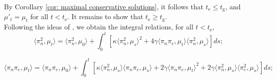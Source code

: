 By Corollary \ref{cor: maximal conservative solutions}, it follows that $t_\mathrm{e} \le t_\mathrm{g}$, and $\mu'_t=\mu_t$ for all $t<t_\mathrm{e}$. It remains to show that $t_\mathrm{e}\ge t_\mathrm{g}$. \medskip \\ Following the ideas of \cite[Proposition 2.7]{N00}, we obtain the integral relations, for all $t<t_\mathrm{e}$, \begin{equation} \label{eq: ODE1}
    \langle \pi_n^2, \mu_t\rangle =
    \langle \pi_n^2, \mu_0\rangle + \int_0^t \left[\kappa\langle \pi_n^2, \mu_s\rangle^2+4\gamma\langle \pi_n\pi_e, \mu_t\rangle\langle\pi_n^2, \mu_s\rangle \right] ds;
\end{equation} 

\begin{equation}\label{eq: ODE2}
    \langle \pi_n \pi_e, \mu_t\rangle =
    \langle \pi_n\pi_e, \mu_0\rangle + \int_0^t \left[\kappa\langle \pi_n^2, \mu_s\rangle\langle \pi_n\pi_e, \mu_s\rangle+2\gamma\langle \pi_n\pi_e, \mu_t\rangle^2+2\gamma\langle\pi_n^2, \mu_s\rangle\langle \pi_e^2, \mu_s \rangle \right] ds;
\end{equation}

